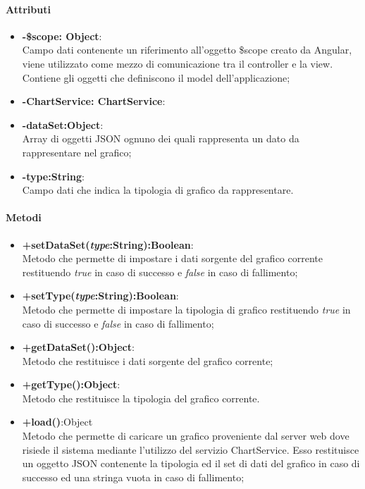 	\paragraph{Attributi}
	\begin{itemize}
		\item \textbf{-\$scope: Object}:\\
			Campo dati contenente un riferimento all'oggetto \$scope creato da Angular, viene utilizzato come mezzo di comunicazione tra il controller e la view. Contiene gli oggetti che definiscono il model dell'applicazione;
		\item \textbf{-ChartService: ChartService}:\\
			
		\item\textbf{-dataSet:Object}:\\
			Array di oggetti JSON ognuno dei quali rappresenta un dato da rappresentare nel grafico;
		\item\textbf{-type:String}:\\
			Campo dati che indica la tipologia di grafico da rappresentare.
	\end{itemize}
	
	\paragraph{Metodi}
	\begin{itemize}
	\item \textbf{+setDataSet(\textit{type}:String):Boolean}:\\
		Metodo che permette di impostare i dati sorgente del grafico corrente restituendo \textit{true} in caso di successo e \textit{false} in caso di fallimento;
	\item \textbf{+setType(\textit{type}:String):Boolean}:\\
		Metodo che permette di impostare la tipologia di grafico restituendo \textit{true} in caso di successo e \textit{false} in caso di fallimento;
	\item \textbf{+getDataSet():Object}:\\
		Metodo che restituisce i dati sorgente del grafico corrente;
	\item \textbf{+getType():Object}:\\
		Metodo che restituisce la tipologia del grafico corrente.
	\item \textbf{+load()}:Object	\\	
		Metodo che permette di caricare un grafico proveniente dal server web dove risiede il sistema mediante l'utilizzo del servizio ChartService. Esso restituisce un oggetto JSON contenente la tipologia ed il set di dati del grafico in caso di successo ed una stringa vuota in caso di fallimento;
	
	\end{itemize}
